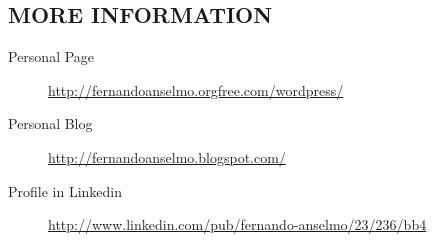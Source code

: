 \documentclass{res}
\begin{document}
\begin{resume}
		\section{MORE INFORMATION}
		\vspace{18pt} 
		\begin{description}
			\item[Personal Page] \url{http://fernandoanselmo.orgfree.com/wordpress/}
			\item[Personal Blog] \url{http://fernandoanselmo.blogspot.com/}
			\item[Profile in Linkedin] \url{http://www.linkedin.com/pub/fernando-anselmo/23/236/bb4}
		\end{description}
		
	\end{resume} 
\end{document}
